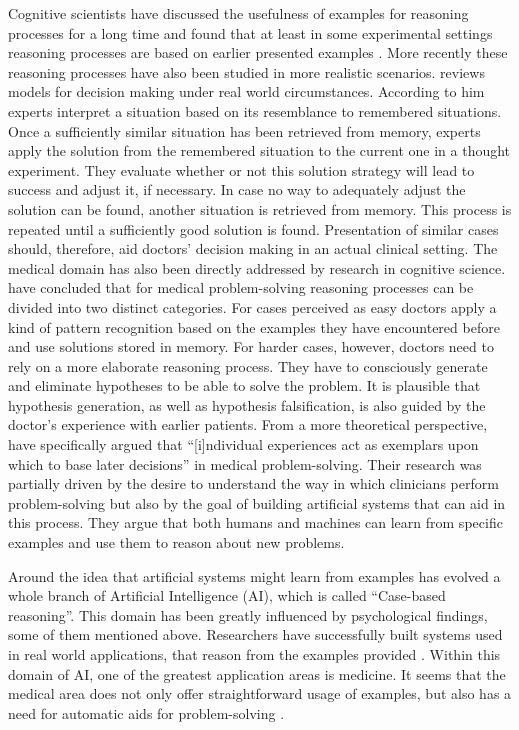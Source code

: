 Cognitive scientists have discussed the usefulness of examples for reasoning processes for a long time and found that at least in some experimental settings reasoning processes are based on earlier presented examples \citep{Medin1978}. More recently these reasoning processes have also been studied in more realistic scenarios. \citet{Klein2008} reviews models for decision making under real world circumstances. According to him experts interpret a situation based on its resemblance to remembered situations. Once a sufficiently similar situation has been retrieved from memory, experts apply the solution from the remembered situation to the current one in a thought experiment. They evaluate whether or not this solution strategy will lead to success and adjust it, if necessary. In case no way to adequately adjust the solution can be found, another situation is retrieved from memory. This process is repeated until a sufficiently good solution is found. Presentation of similar cases should, therefore, aid doctors' decision making in an actual clinical setting. The medical domain has also been directly addressed by research in cognitive science. \citet{Elstein2002} have concluded that for medical problem-solving reasoning processes can be divided into two distinct categories. For cases perceived as easy doctors apply a kind of pattern recognition based on the examples they have encountered before and use solutions stored in memory. For harder cases, however, doctors need to rely on a more elaborate reasoning process. They have to consciously generate and eliminate hypotheses to be able to solve the problem. It is plausible that hypothesis generation, as well as hypothesis falsification, is also guided by the doctor's experience with earlier patients. From a more theoretical perspective, \citet{Kolodner1987} have specifically argued that ``[i]ndividual experiences act as exemplars upon which to base later decisions'' in medical problem-solving. Their research was partially driven by the desire to understand the way in which clinicians perform problem-solving but also by the goal of building artificial systems that can aid in this process. They argue that both humans and machines can learn from specific examples and use them to reason about new problems.

Around the idea that artificial systems might learn from examples has evolved a whole branch of Artificial Intelligence (AI), which is called ``Case-based reasoning''. This domain has been greatly influenced by psychological findings, some of them mentioned above. Researchers have successfully built systems used in real world applications, that reason from the examples provided  \citep{Aamodt1994}. Within this domain of AI, one of the greatest application areas is medicine. It seems that the medical area does not only offer straightforward usage of examples, but also has a need for automatic aids for problem-solving \citep{Begum2011}.

